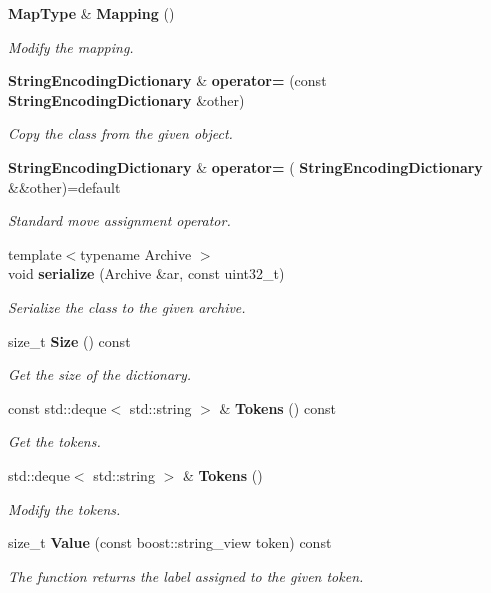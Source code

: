 \begin{DoxyCompactItemize}
\textbf{ Map\+Type} \& \textbf{ Mapping} ()
\begin{DoxyCompactList}\small\item\em Modify the mapping. \end{DoxyCompactList}\item 
\textbf{ String\+Encoding\+Dictionary} \& \textbf{ operator=} (const \textbf{ String\+Encoding\+Dictionary} \&other)
\begin{DoxyCompactList}\small\item\em Copy the class from the given object. \end{DoxyCompactList}\item 
\textbf{ String\+Encoding\+Dictionary} \& \textbf{ operator=} (\textbf{ String\+Encoding\+Dictionary} \&\&other)=default
\begin{DoxyCompactList}\small\item\em Standard move assignment operator. \end{DoxyCompactList}\item 
{\footnotesize template$<$typename Archive $>$ }\\void \textbf{ serialize} (Archive \&ar, const uint32\+\_\+t)
\begin{DoxyCompactList}\small\item\em Serialize the class to the given archive. \end{DoxyCompactList}\item 
size\+\_\+t \textbf{ Size} () const
\begin{DoxyCompactList}\small\item\em Get the size of the dictionary. \end{DoxyCompactList}\item 
const std\+::deque$<$ std\+::string $>$ \& \textbf{ Tokens} () const
\begin{DoxyCompactList}\small\item\em Get the tokens. \end{DoxyCompactList}\item 
std\+::deque$<$ std\+::string $>$ \& \textbf{ Tokens} ()
\begin{DoxyCompactList}\small\item\em Modify the tokens. \end{DoxyCompactList}\item 
size\+\_\+t \textbf{ Value} (const boost\+::string\+\_\+view token) const
\begin{DoxyCompactList}\small\item\em The function returns the label assigned to the given token. \end{DoxyCompactList}\end{DoxyCompactItemize}


